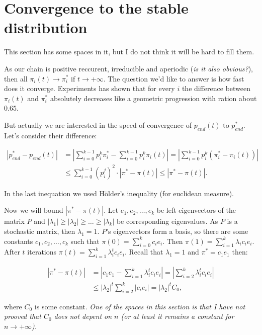 \documentclass{article}
\begin{document}
\section{Convergence to the stable distribution}

This section has some spaces in it, but I do not think it will be hard to fill them.

As our chain is positive reccurent, irreducible and aperiodic (\textit{is it also obvious?}), then all $\pi_i(t) \to \pi^*_i$ if $t \to +\infty.$ The question we'd like to answer is how fast does it converge. Experiments has shown that for every $i$ the difference between $\pi_i(t)$ and $\pi^*_i$ absolutely decreases like a geometric progression with ration about $0.65$.

But actually we are interested in the speed of convergence of $p_{end}(t)$ to $p_{end}^*$. Let's consider their difference:

\begin{align*}
  |p_{end}^* - p_{end}(t)| &= |\sum\limits_{i = 0}^{k - 1} p_i^k \pi^*_i - \sum\limits_{i = 0}^{k - 1} p_i^k \pi_i(t)| = |\sum\limits_{i = 0}^{k - 1} p_i^k (\pi^*_i - \pi_i(t))| \\
  &\le \sum\limits_{i = 0}^{k - 1} (p_i^j)^2 \cdot |\pi^* - \pi(t)| \le |\pi^* - \pi(t)|.
\end{align*}

In the last inequation we used Hölder's inequality (for euclidean measure).

Now we will bound $|\pi^* - \pi(t)|.$ Let $e_1, e_2, \dots, e_k$ be left eigenvectors of the matrix $P$ and $|\lambda_1| \ge |\lambda_2| \ge \dots \ge |\lambda_k|$ be corresponding eigenvalues. As $P$ is a stochastic matrix, then $\lambda_1 = 1.$ $P$'s eigenvectors form a basis, so there are some constants $c_1, c_2, \dots, c_k$ such that $\pi(0) = \sum\limits_{i = 0}^k c_i e_i.$
Then $\pi(1) = \sum\limits_{i = 1}^k \lambda_i c_i e_i.$ After $t$ iterations $\pi(t) = \sum\limits_{i = 1}^k \lambda_i^t c_i e_i.$ Recall that $\lambda_1 = 1$ and $\pi^* = c_1 e_1$ then:

\begin{align*}
  |\pi^* - \pi(t)| &= |c_1 e_1 - \sum\limits_{i = 1}^k \lambda_i^t c_i e_i| = |\sum\limits_{i = 2}^k \lambda_i^t c_i e_i | \\
  &\le |\lambda_2|^t \sum\limits_{i = 2}^k |c_i e_i| = |\lambda_2|^t C_0,
\end{align*}

where $C_0$ is some constant. \textit{One of the spaces in this section is that I have not prooved that $C_0$ does not depent on $n$ (or at least it remains a constant for $n \to +\infty$).}
\end{document}
